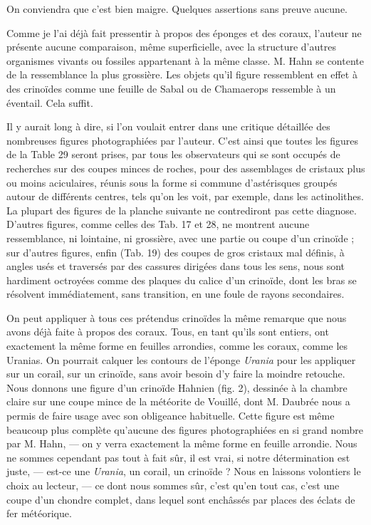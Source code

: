 \documentclass[a4paper, 12pt, oneside, french]{article}
\begin{document}
On conviendra que c'est bien maigre. Quelques assertions sans preuve aucune.

Comme je l'ai déjà fait pressentir à propos des éponges et des coraux, l'auteur ne présente aucune comparaison, même superficielle, avec la structure d'autres organismes vivants ou fossiles appartenant à la même classe. M. Hahn se contente de la ressemblance la plus grossière. Les objets qu'il figure ressemblent en effet à des crinoïdes comme une feuille de Sabal ou de Chamaerops ressemble à un éventail. Cela suffit.

Il y aurait long à dire, si l'on voulait entrer dans une critique détaillée des nombreuses figures photographiées par l'auteur. C'est ainsi que toutes les figures de la Table 29 seront prises, par tous les observateurs qui se sont occupés de recherches sur des coupes minces de roches, pour des assemblages de cristaux plus ou moins aciculaires, réunis sous la forme si commune d'astérisques groupés autour de différents centres, tels qu'on les voit, par exemple, dans les actinolithes. La plupart des figures de la planche suivante ne contrediront pas cette diagnose. D'autres figures, comme celles des Tab. 17 et 28, ne montrent aucune ressemblance, ni lointaine, ni grossière, avec une partie ou coupe d'un crinoïde ; sur d'autres figures, enfin (Tab. 19) des coupes de gros cristaux mal définis, à angles usés et traversés par des cassures dirigées dans tous les sens, nous sont hardiment octroyées comme des plaques du calice d'un crinoïde, dont les bras se résolvent immédiatement, sans transition, en une foule de rayons secondaires.

On peut appliquer à tous ces prétendus crinoïdes la même remarque que nous avons déjà faite à propos des coraux. Tous, en tant qu'ils sont entiers, ont exactement la même forme en feuilles arrondies, comme les coraux, comme les Uranias. On pourrait calquer les contours de l'éponge \emph{Urania} pour les appliquer sur un corail, sur un crinoïde, sans avoir besoin d'y faire la moindre retouche. Nous donnons une figure d'un crinoïde Hahnien (fig. 2), dessinée à la chambre claire sur une coupe mince de la météorite de Vouillé, dont M. Daubrée nous a permis de faire usage avec son obligeance habituelle. Cette figure est même beaucoup plus complète qu'aucune des figures photographiées en si grand nombre par M. Hahn, --- on y verra exactement la même forme en feuille arrondie. Nous ne sommes cependant pas tout à fait sûr, il est vrai, si notre détermination est juste, --- est-ce une \emph{Urania}, un corail, un crinoïde ? Nous en laissons volontiers le choix au lecteur, --- ce dont nous sommes sûr, c'est qu'en tout cas, c'est une coupe d'un chondre complet, dans lequel sont enchâssés par places des éclats de fer météorique.
\end{document}
